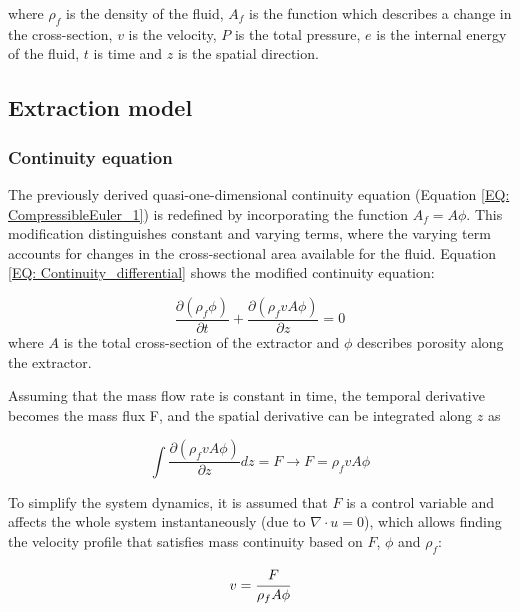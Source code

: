\documentclass[../Article_Model_Parameters.tex]{subfiles}
\begin{document}
	where $\rho_f$ is the density of the fluid, $A_f$ is the function which describes a change in the cross-section, $v$ is the velocity, $P$ is the total pressure, $e$ is the internal energy of the fluid, $t$ is time and $z$ is the spatial direction.
	
	\subsection{Extraction model} \label{CH: Extraction_model}
	\subsubsection{Continuity equation} \label{CH: Continuity}
	
	The previously derived quasi-one-dimensional continuity equation (Equation \ref{EQ: CompressibleEuler_1}) is redefined by incorporating the function $A_f = A\phi$. This modification distinguishes constant and varying terms, where the varying term accounts for changes in the cross-sectional area available for the fluid. Equation \ref{EQ: Continuity_differential} shows the modified continuity equation:
	
	{\footnotesize
		\begin{equation} \label{EQ: Continuity_differential}
			\frac{\partial (\rho_f \phi)}{\partial t} + \frac{\partial (\rho_f v A\phi)}{\partial z} = 0
		\end{equation}
	}
	where $A$ is the total cross-section of the extractor and $\phi$ describes porosity along the extractor.
	
	Assuming that the mass flow rate is constant in time, the temporal derivative becomes the mass flux F, and the spatial derivative can be integrated along $z$ as
	
	{\footnotesize
		\begin{equation}
			\int \frac{\partial (\rho_f v A \phi )}{\partial z} dz = F \rightarrow F=\rho_f v A\phi
		\end{equation}
	}
	
	To simplify the system dynamics, it is assumed that $F$ is a control variable and affects the whole system instantaneously (due to $\nabla \cdot u = 0$), which allows finding the velocity profile that satisfies mass continuity based on $F$, $\phi$ and $\rho_f$:
	
	{\footnotesize
		\begin{equation} \label{EQ:Velocity_1}
			v = \cfrac{F}{\rho_f A\phi} 
		\end{equation}
	}
	
\end{document}
